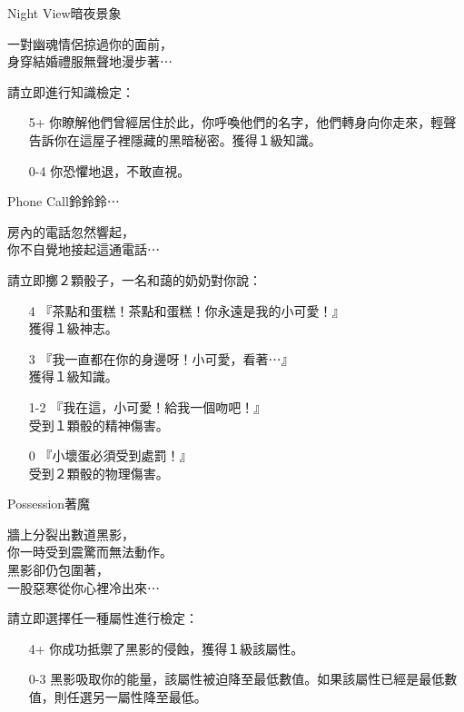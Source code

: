 %
\begin{EventCard}{Night View}{暗夜景象}

  \begin{CardStory}
    一對幽魂情侶掠過你的面前，\\
    身穿結婚禮服無聲地漫步著⋯
  \end{CardStory}

  請立即進行知識檢定：
  \begin{itemize}
    \item[5+] 你瞭解他們曾經居住於此，你呼喚他們的名字，他們轉身向你走來，輕聲告訴你在這屋子裡隱藏的黑暗秘密。獲得１級知識。
    \item[0-4] 你恐懼地退，不敢直視。
  \end{itemize}

\end{EventCard}%
%
\begin{EventCard}{Phone Call}{鈴鈴鈴⋯}

  \begin{CardStory}
    房內的電話忽然響起，\\
    你不自覺地接起這通電話⋯
  \end{CardStory}

  請立即擲２顆骰子，一名和藹的奶奶對你說：
  \begin{itemize}
    \item[4] 『茶點和蛋糕！茶點和蛋糕！你永遠是我的小可愛！』\\
獲得１級神志。
    \item[3] 『我一直都在你的身邊呀！小可愛，看著⋯』\\
獲得１級知識。
    \item[1-2] 『我在這，小可愛！給我一個吻吧！』\\
受到１顆骰的精神傷害。
    \item[0] 『小壞蛋必須受到處罰！』\\
受到２顆骰的物理傷害。
  \end{itemize}

\end{EventCard}%
%
\begin{EventCard}{Possession}{著魔}

  \begin{CardStory}
    牆上分裂出數道黑影，\\
    你一時受到震驚而無法動作。\\
    黑影卻仍包圍著，\\
    一股惡寒從你心裡冷出來⋯
  \end{CardStory}

  請立即選擇任一種屬性進行檢定：
  \begin{itemize}
    \item[4+] 你成功抵禦了黑影的侵蝕，獲得１級該屬性。
    \item[0-3] 黑影吸取你的能量，該屬性被迫降至最低數值。如果該屬性已經是最低數值，則任選另一屬性降至最低。
  \end{itemize}

\end{EventCard}%
